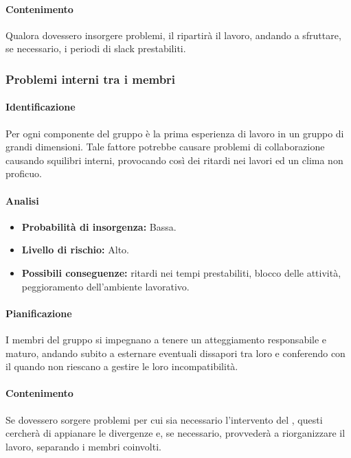 \paragraph {Contenimento}
Qualora dovessero insorgere problemi, il \RdP{} ripartirà il lavoro, andando a sfruttare, se necessario, i periodi di slack prestabiliti. 

\subsubsection{Problemi interni tra i membri}
\paragraph {Identificazione}
Per ogni componente del gruppo è la prima esperienza di lavoro in un gruppo di grandi dimensioni. Tale fattore potrebbe causare problemi di collaborazione causando squilibri interni, provocando così dei ritardi nei lavori ed un clima non proficuo.

\paragraph {Analisi}
\begin{itemize}
	\item \textbf{Probabilità di insorgenza:} Bassa.
	\item \textbf{Livello di rischio:} Alto.
	\item \textbf{Possibili conseguenze:} ritardi nei tempi prestabiliti, blocco delle attività, peggioramento dell'ambiente lavorativo.
\end{itemize}

\paragraph {Pianificazione}
I membri del gruppo si impegnano a tenere un atteggiamento responsabile e maturo, andando subito a esternare eventuali dissapori tra loro e conferendo con il \RdP{} quando non riescano a gestire le loro incompatibilità.

\paragraph {Contenimento}
Se dovessero sorgere problemi per cui sia necessario l'intervento del \RdP{}, questi cercherà di appianare le divergenze e, se necessario, provvederà a riorganizzare il lavoro, separando i membri coinvolti.

